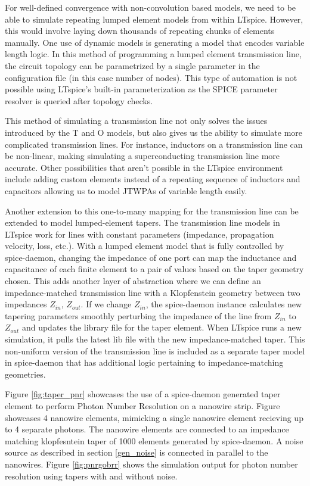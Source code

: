\documentclass[]{article}
\begin{document}
For well-defined convergence with non-convolution based models, we need to be able to simulate repeating
lumped element models from within LTspice. 
However, this would involve laying down thousands 
of repeating chunks of elements manually. One use of dynamic models is generating a model 
that encodes variable length logic. In this method of programming a lumped element transmission
line, the circuit topology can be parametrized by a single parameter in the configuration file 
(in this case number of nodes). This type of automation is not possible using LTspice's built-in
parameterization as the SPICE parameter resolver is queried after topology checks.

This method of simulating a transmission line not only solves the issues introduced by the
T and O models, but also gives us the ability to simulate more complicated transmission lines.
For instance, inductors on a transmission line can be non-linear, making simulating a superconducting
transmission line more accurate. Other possibilities that aren't possible in the LTspice environment
include adding custom elements instead of a repeating sequence of inductors and capacitors allowing us to
model JTWPAs of variable length easily.

Another extension to this one-to-many mapping for the transmission line can be extended to model
lumped-element tapers. The transmission line models in LTspice work for lines with constant 
parameters (impedance, propagation velocity, loss, etc.). With a lumped element model that is fully
controlled by spice-daemon, changing the impedance of one port can map the inductance and capacitance
of each finite element to a pair of values based on the taper geometry chosen. This adds another layer
of abstraction where we can define an impedance-matched transmission line with a Klopfenstein geometry
between two impedances $Z_{in},\, Z_{out}$. If we change $Z_{in}$, the spice-daemon instance calculates
new tapering parameters smoothly perturbing the impedance of the line from $Z_{in}$ to $Z_{out}$ and
updates the library file for the taper element. 
When LTspice runs a new simulation, it pulls the latest
lib file with the new impedance-matched taper. This non-uniform version of the transmission line
is included as a separate taper model in spice-daemon that has additional logic pertaining to 
impedance-matching geometries.

Figure \ref{fig:taper_pnr} showcases the use of a spice-daemon generated
taper element to perform Photon Number Resolution on a nanowire strip. 
Figure \label{fig:taper_circ} showcases 4 nanowire elements, mimicking
a single nanowire element recieving up to 4 separate photons. The nanowire
elements are connected to an impedance matching klopfesntein taper of 1000
elements generated by spice-daemon. A noise source as described in section
\ref{gen_noise} is connected in parallel to the nanowires. Figure \ref{fig:pnrgobrr}
shows the simulation output for photon number resolution using tapers with 
and without noise.
\end{document}
